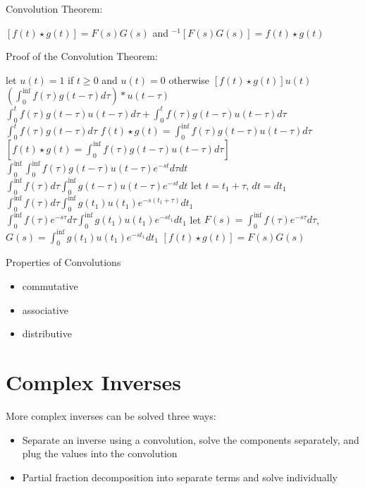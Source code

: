 \documentclass[12 pt, oneside]{book}
\begin{document}
Convolution Theorem:
\begin{mathline}
\laplace $[f(t)\star g(t)]=F(s)G(s)$ and \laplace$^{-1}[F(s)G(s)]=f(t)\star g(t)$
\end{mathline}

Proof of the Convolution Theorem:\newline{}
\begin{mathline}
let $u(t)=1$ if $t\geq 0$ and $u(t)=0$ otherwise\newline{}
$[f(t)\star g(t)]u(t)$\newline{}
$(\int^{\inf}_0 f(\tau)g(t-\tau)d\tau) * u(t-\tau)$\newline{}
$\int^t_0 f(\tau)g(t-\tau)u(t-\tau)d\tau + \int^t_0 f(\tau)g(t-\tau)u(t-\tau)d\tau$\newline{}
$\int^t_0 f(\tau)g(t-\tau)d\tau$\newline{}
$f(t)\star g(t)= \int^{\inf}_0 f(\tau)g(t-\tau)u(t-\tau)d\tau$\newline{}
\laplace $[f(t)\star g(t)= \int^{\inf}_0 f(\tau)g(t-\tau)u(t-\tau)d\tau]$\newline{}
$\int^{\inf}_0\int^{\inf}_0 f(\tau)g(t-\tau)u(t-\tau)e^{-st}d\tau dt$\newline{}
$\int^{\inf}_0f(\tau)d\tau\int^{\inf}_0 g(t-\tau)u(t-\tau)e^{-st} dt$\newline{}
let $t=t_1+\tau$, $dt=dt_1$\newline{}
$\int^{\inf}_0f(\tau)d\tau\int^{\inf}_0 g(t_1)u(t_1)e^{-s(t_1+\tau)} dt_1$\newline{}
$\int^{\inf}_0f(\tau)e^{-s\tau}d\tau\int^{\inf}_0 g(t_1)u(t_1)e^{-st_1} dt_1$\newline{}
let $F(s)=\int^{\inf}_0f(\tau)e^{-s\tau}d\tau$, $G(s)=\int^{\inf}_0 g(t_1)u(t_1)e^{-st_1} dt_1$\newline{}
\laplace$[f(t)\star g(t)]=F(s)G(s)$
\end{mathline}

Properties of Convolutions
\begin{itemize}
\item commutative
\item associative
\item distributive
\end{itemize}

\section{Complex Inverses}
More complex inverses can be solved three ways:

\begin{itemize}
\item Separate an inverse using a convolution, solve the components separately, and plug the values into the convolution
\item Partial fraction decomposition into separate terms and solve individually
\end{itemize}
\end{document}
